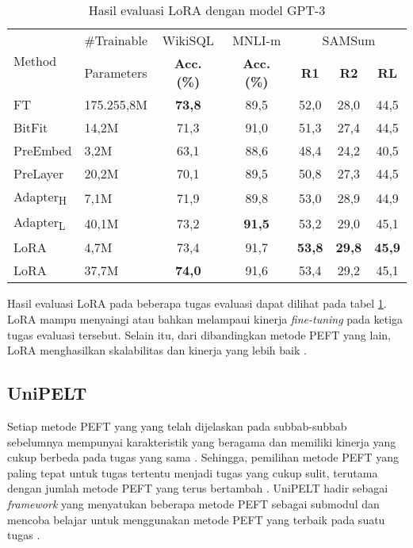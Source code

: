 \begin{table}[ht]
    \vspace{0.25cm}
    \centering
    \caption{Hasil evaluasi LoRA dengan model GPT-3 \parencite{lora}}
    \label{table:lora_result}
    \begin{tabular}{l|l|ccccc}
        \toprule
        \multirow{2}{*}{Method} & \#Trainable & WikiSQL & MNLI-m & \multicolumn{3}{c}{SAMSum} \\
         & Parameters & \textbf{Acc. (\%)} & \textbf{Acc. (\%)} & \textbf{R1} & \textbf{R2} & \textbf{RL} \\
        \midrule
        FT & 175.255,8M & \textbf{73,8} & 89,5 & 52,0 & 28,0 & 44,5 \\
        BitFit & 14,2M & 71,3 & 91,0 & 51,3 & 27,4 & 44,5 \\
        PreEmbed & 3,2M & 63,1 & 88,6 & 48,4 & 24,2 & 40,5 \\
        PreLayer & 20,2M & 70,1 & 89,5 & 50,8 & 27,3 & 44,5 \\
        Adapter\textsubscript{H}  & 7,1M & 71,9 & 89,8 & 53,0 & 28,9 & 44,9 \\
        Adapter\textsubscript{L}  & 40,1M & 73,2 & \textbf{91,5} & 53,2 & 29,0 & 45,1 \\
        LoRA  & 4,7M & 73,4 & 91,7 & \textbf{53,8} & \textbf{29,8} & \textbf{45,9} \\
        LoRA  & 37,7M & \textbf{74,0} & 91,6 & 53,4 & 29,2 & 45,1 \\
        \bottomrule
    \end{tabular}
\end{table}

Hasil evaluasi LoRA pada beberapa tugas evaluasi dapat dilihat pada tabel \ref{table:lora_result}. LoRA mampu menyaingi atau bahkan melampaui kinerja \textit{fine-tuning} pada ketiga tugas evaluasi tersebut. Selain itu, dari dibandingkan metode PEFT yang lain, LoRA menghasilkan skalabilitas dan kinerja yang lebih baik \parencite{lora}.

\subsection{UniPELT}

Setiap metode PEFT yang yang telah dijelaskan pada subbab-subbab sebelumnya mempunyai karakteristik yang beragama dan memiliki kinerja yang cukup berbeda pada tugas yang sama \parencite{unipelt}. Sehingga, pemilihan metode PEFT yang paling tepat untuk tugas tertentu menjadi tugas yang cukup sulit, terutama dengan jumlah metode PEFT yang terus bertambah \parencite{unipelt}. UniPELT hadir sebagai \textit{framework} yang menyatukan beberapa metode PEFT sebagai submodul dan mencoba belajar untuk menggunakan metode PEFT yang terbaik pada suatu tugas \parencite{unipelt}.

